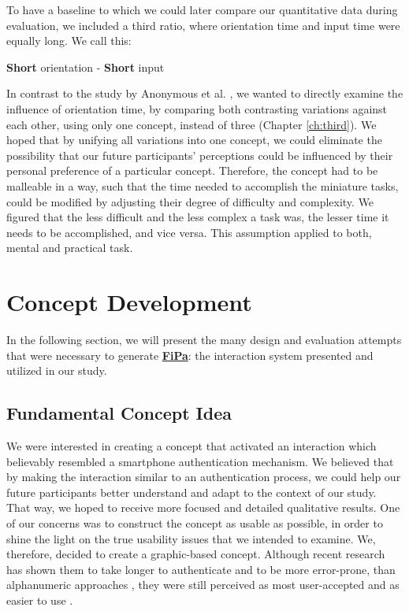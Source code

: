 To have a baseline to which we could later compare our quantitative data during evaluation, we included a third ratio, where orientation time and input time were equally long. We call this:  
\begin{center}
\textbf{Short} orientation - \textbf{Short} input
\end{center} 

In contrast to the study by Anonymous et al. \cite{anonymous}, we wanted to directly examine the influence of orientation time, by comparing both contrasting variations against each other, using only one concept, instead of three (Chapter \ref{ch:third}). We hoped that by unifying all variations into one concept, we could eliminate the possibility that our future participants' perceptions could be influenced by their personal preference of a particular concept. Therefore, the concept had to be malleable in a way, such that the time needed to accomplish the miniature tasks, could be modified by adjusting their degree of difficulty and complexity. We figured that the less difficult and the less complex a task was, the lesser time it needs to be accomplished, and vice versa. This assumption applied to both, mental and practical task.

\section{Concept Development} \label{4.2}

In the following section, we will present the many design and evaluation attempts that were necessary to generate \underline{\textbf{FiPa}}: the interaction system presented and utilized in our study. 

\subsection{Fundamental Concept Idea} \label{4.2.1}
We were interested in creating a concept that activated an interaction which believably resembled a smartphone authentication mechanism. We believed that by making the interaction similar to an authentication process, we could help our future participants better understand and adapt to the context of our study. That way, we hoped to receive more focused and detailed qualitative results. One of our concerns was to construct the concept as usable as possible, in order to shine the light on the true usability issues that we intended to examine. We, therefore, decided to create a graphic-based concept. Although recent research has shown them to take longer to authenticate and to be more error-prone, than alphanumeric approaches \cite{AnatomySmartphone}, they were still perceived as most user-accepted and as easier to use \cite{PatternWild}.\\

